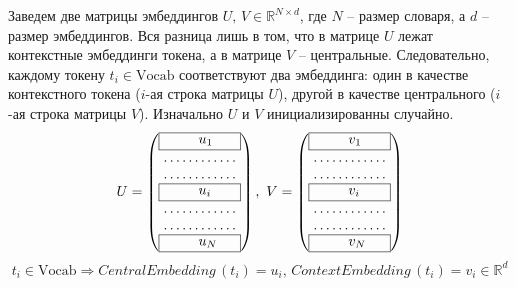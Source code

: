 \documentclass[12pt]{article}
\def\R{\mathbb{R}}       %
\theoremstyle{definition} %
\theoremstyle{plain} %
\theoremstyle{remark} %
\begin{document}
Заведем две матрицы эмбеддингов $U, \, V \in \R^{N \times d}$, где $N$ -- размер словаря, а $d$ -- размер эмбеддингов. Вся разница лишь в том, что в матрице $U$ лежат контекстные эмбеддинги токена, а в матрице $V$ -- центральные. Следовательно, каждому токену $t_i \in \text{Vocab}$ соответствуют два эмбеддинга: один в качестве контекстного токена ($i$-ая строка матрицы $U$), другой в качестве центрального ($i$-ая строка матрицы $V$). Изначально $U$ и $V$ инициализированны случайно.
\[
U = 
\begin{pmatrix}
    \fbox{\begin{minipage}{0,15\textwidth} $\quad \quad \,\,\, u_1$ \end{minipage}} \\
    \dots  \dots  \dots \dots \\
    \dots  \dots  \dots \dots \\
    \fbox{\begin{minipage}{0,15\textwidth} $\quad \quad \,\,\, u_i$ \end{minipage}} \\
    \dots  \dots  \dots \dots \\
    \dots  \dots  \dots \dots \\
    \fbox{\begin{minipage}{0,15\textwidth} $\quad \quad \,\,\, u_N$ \end{minipage}} \\
\end{pmatrix}, \,\,
V = 
\begin{pmatrix}
    \fbox{\begin{minipage}{0,15\textwidth} $\quad \quad \,\,\, v_1$ \end{minipage}} \\
    \dots  \dots  \dots \dots \\
    \dots  \dots  \dots \dots \\
    \fbox{\begin{minipage}{0,15\textwidth} $\quad \quad \,\,\, v_i$ \end{minipage}} \\
    \dots  \dots  \dots \dots \\
    \dots  \dots  \dots \dots \\
    \fbox{\begin{minipage}{0,15\textwidth} $\quad \quad \,\,\, v_N$ \end{minipage}} \\
\end{pmatrix}
\]
\[
t_i \in \text{Vocab} \Rightarrow \textit{CentralEmbedding}\,(t_i) = u_i, \, \textit{ContextEmbedding}\,(t_i) = v_i \in \R^d
\]
\end{document}
